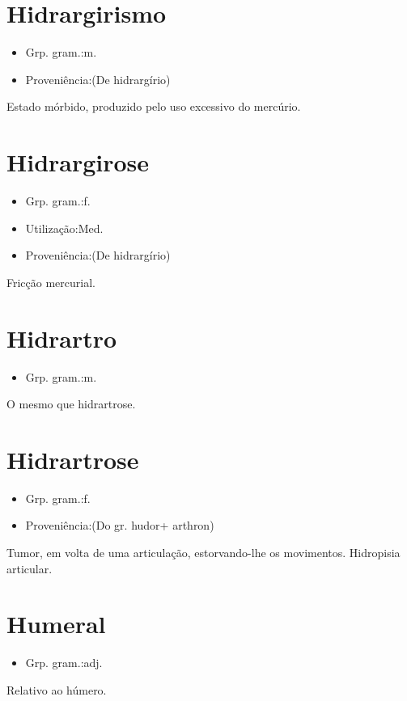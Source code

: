 \documentclass{article}
\begin{document}
\section{Hidrargirismo}
\begin{itemize}
\item {Grp. gram.:m.}
\end{itemize}
\begin{itemize}
\item {Proveniência:(De \textunderscore hidrargírio\textunderscore )}
\end{itemize}
Estado mórbido, produzido pelo uso excessivo do mercúrio.
\section{Hidrargirose}
\begin{itemize}
\item {Grp. gram.:f.}
\end{itemize}
\begin{itemize}
\item {Utilização:Med.}
\end{itemize}
\begin{itemize}
\item {Proveniência:(De \textunderscore hidrargírio\textunderscore )}
\end{itemize}
Fricção mercurial.
\section{Hidrartro}
\begin{itemize}
\item {Grp. gram.:m.}
\end{itemize}
O mesmo que \textunderscore hidrartrose\textunderscore .
\section{Hidrartrose}
\begin{itemize}
\item {Grp. gram.:f.}
\end{itemize}
\begin{itemize}
\item {Proveniência:(Do gr. \textunderscore hudor\textunderscore  + \textunderscore arthron\textunderscore )}
\end{itemize}
Tumor, em volta de uma articulação, estorvando-lhe os movimentos.
Hidropisia articular.
\section{Humeral}
\begin{itemize}
\item {Grp. gram.:adj.}
\end{itemize}
Relativo ao húmero.
\end{document}
